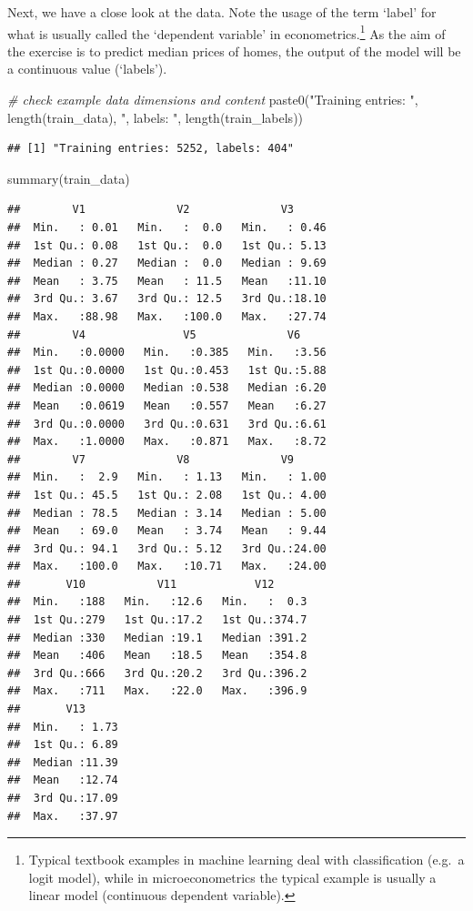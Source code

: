 \documentclass[
  12pt,
]{style/krantz}
\newenvironment{Shaded}{\begin{snugshade}}{\end{snugshade}}
\newcommand{\CommentTok}[1]{\textcolor[rgb]{0.56,0.35,0.01}{\textit{#1}}}
\newcommand{\FunctionTok}[1]{\textcolor[rgb]{0.00,0.00,0.00}{#1}}
\newcommand{\NormalTok}[1]{#1}
\newcommand{\StringTok}[1]{\textcolor[rgb]{0.31,0.60,0.02}{#1}}
\begin{document}
Next, we have a close look at the data. Note the usage of the term `label' for what is usually called the `dependent variable' in econometrics.\footnote{Typical textbook examples in machine learning deal with classification (e.g.~a logit model), while in microeconometrics the typical example is usually a linear model (continuous dependent variable).} As the aim of the exercise is to predict median prices of homes, the output of the model will be a continuous value (`labels').

\begin{Shaded}
\begin{Highlighting}[]
\CommentTok{\# check example data dimensions and content}
\FunctionTok{paste0}\NormalTok{(}\StringTok{"Training entries: "}\NormalTok{, }\FunctionTok{length}\NormalTok{(train\_data), }\StringTok{", labels: "}\NormalTok{, }\FunctionTok{length}\NormalTok{(train\_labels))}
\end{Highlighting}
\end{Shaded}

\begin{verbatim}
## [1] "Training entries: 5252, labels: 404"
\end{verbatim}

\begin{Shaded}
\begin{Highlighting}[]
\FunctionTok{summary}\NormalTok{(train\_data)}
\end{Highlighting}
\end{Shaded}

\begin{verbatim}
##        V1              V2              V3       
##  Min.   : 0.01   Min.   :  0.0   Min.   : 0.46  
##  1st Qu.: 0.08   1st Qu.:  0.0   1st Qu.: 5.13  
##  Median : 0.27   Median :  0.0   Median : 9.69  
##  Mean   : 3.75   Mean   : 11.5   Mean   :11.10  
##  3rd Qu.: 3.67   3rd Qu.: 12.5   3rd Qu.:18.10  
##  Max.   :88.98   Max.   :100.0   Max.   :27.74  
##        V4               V5              V6      
##  Min.   :0.0000   Min.   :0.385   Min.   :3.56  
##  1st Qu.:0.0000   1st Qu.:0.453   1st Qu.:5.88  
##  Median :0.0000   Median :0.538   Median :6.20  
##  Mean   :0.0619   Mean   :0.557   Mean   :6.27  
##  3rd Qu.:0.0000   3rd Qu.:0.631   3rd Qu.:6.61  
##  Max.   :1.0000   Max.   :0.871   Max.   :8.72  
##        V7              V8              V9       
##  Min.   :  2.9   Min.   : 1.13   Min.   : 1.00  
##  1st Qu.: 45.5   1st Qu.: 2.08   1st Qu.: 4.00  
##  Median : 78.5   Median : 3.14   Median : 5.00  
##  Mean   : 69.0   Mean   : 3.74   Mean   : 9.44  
##  3rd Qu.: 94.1   3rd Qu.: 5.12   3rd Qu.:24.00  
##  Max.   :100.0   Max.   :10.71   Max.   :24.00  
##       V10           V11            V12       
##  Min.   :188   Min.   :12.6   Min.   :  0.3  
##  1st Qu.:279   1st Qu.:17.2   1st Qu.:374.7  
##  Median :330   Median :19.1   Median :391.2  
##  Mean   :406   Mean   :18.5   Mean   :354.8  
##  3rd Qu.:666   3rd Qu.:20.2   3rd Qu.:396.2  
##  Max.   :711   Max.   :22.0   Max.   :396.9  
##       V13       
##  Min.   : 1.73  
##  1st Qu.: 6.89  
##  Median :11.39  
##  Mean   :12.74  
##  3rd Qu.:17.09  
##  Max.   :37.97
\end{verbatim}
\end{document}
